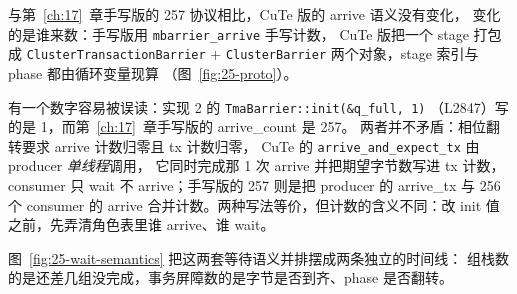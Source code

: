 与第~\ref{ch:17}~章手写版的 257 协议相比，CuTe 版的 arrive 语义没有变化，
变化的是谁来数：手写版用 \texttt{mbarrier\_\allowbreak{}arrive} 手写计数，
CuTe 版把一个 stage 打包成 \texttt{Cluster\allowbreak{}Transaction\allowbreak{}Barrier} +
\texttt{Cluster\allowbreak{}Barrier} 两个对象，stage 索引与 phase 都由循环变量现算
（图~\ref{fig:25-proto}）。

有一个数字容易被误读：实现 2 的 \texttt{Tma\allowbreak{}Barrier::\allowbreak{}init\allowbreak{}(\&q\_\allowbreak{}full,\allowbreak{} 1)}
（L2847）写的是 1，而第~\ref{ch:17}~章手写版的 arrive\_count 是 257。
两者并不矛盾：相位翻转要求 arrive 计数归零且 tx 计数归零，
CuTe 的 \texttt{arrive\_\allowbreak{}and\_\allowbreak{}expect\_\allowbreak{}tx} 由 producer \emph{单线程}调用，
它同时完成那 1 次 arrive 并把期望字节数写进 tx 计数，consumer 只 wait
不 arrive；手写版的 257 则是把 producer 的 arrive\_tx 与 256 个 consumer
的 arrive 合并计数。两种写法等价，但计数的含义不同：改 init
值之前，先弄清角色表里谁 arrive、谁 wait。

图~\ref{fig:25-wait-semantics} 把这两套等待语义并排摆成两条独立的时间线：
组栈数的是还差几组没完成，事务屏障数的是字节是否到齐、phase 是否翻转。

